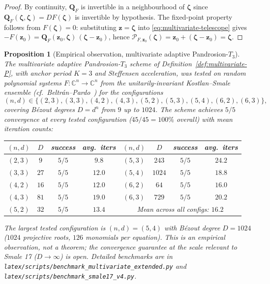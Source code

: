 \documentclass[11pt,a4paper]{article}
\newtheorem{proposition}[theorem]{Proposition}
\begin{document}
\begin{proof}
By continuity, $\mathbf{Q}_F$ is invertible in a neighbourhood of $\boldsymbol\zeta$ since $\mathbf{Q}_F(\boldsymbol\zeta, \boldsymbol\zeta) = DF(\boldsymbol\zeta)$ is invertible by hypothesis. The fixed-point property follows from $F(\boldsymbol\zeta) = 0$: substituting $\mathbf{z} = \boldsymbol\zeta$ into \eqref{eq:multivariate-telescope} gives $-F(\mathbf{z}_0) = \mathbf{Q}_F(\mathbf{z}_0, \boldsymbol\zeta)\,(\boldsymbol\zeta - \mathbf{z}_0)$, hence $\mathcal{P}_{F, \mathbf{z}_0}(\boldsymbol\zeta) = \mathbf{z}_0 + (\boldsymbol\zeta - \mathbf{z}_0) = \boldsymbol\zeta$.
\end{proof}

\begin{proposition}[Empirical observation, multivariate adaptive Pandrosion-$T_3$]\label{thm:multivariate-empirical}
The multivariate adaptive Pandrosion-$T_3$ scheme of Definition~\ref{def:multivariate-P}, with anchor period $K = 3$ and Steffensen acceleration, was tested on random polynomial systems $F: \mathbb{C}^n \to \mathbb{C}^n$ from the unitarily-invariant Kostlan--Smale ensemble (cf.\ Beltr\'an--Pardo~\cite{beltranpardo}) for the configurations
\begin{equation*}
(n, d) \in \{(2, 3), (3, 3), (4, 2), (4, 3), (5, 2), (5, 3), (5, 4), (6, 2), (6, 3)\},
\end{equation*}
covering B\'ezout degrees $D = d^n$ from $9$ up to $1024$. The scheme achieves $5/5$ convergence at \emph{every} tested configuration ($45/45 = 100\%$ overall) with mean iteration counts:
\begin{center}
\begin{tabular}{cccc|cccc}
\toprule
$(n, d)$ & $D$ & success & avg.\ iters & $(n, d)$ & $D$ & success & avg.\ iters \\
\midrule
$(2, 3)$ & $9$  & $5/5$ & $9.8$  & $(5, 3)$ & $243$  & $5/5$ & $24.2$ \\
$(3, 3)$ & $27$ & $5/5$ & $12.0$ & $(5, 4)$ & $1024$ & $5/5$ & $18.8$ \\
$(4, 2)$ & $16$ & $5/5$ & $12.0$ & $(6, 2)$ & $64$   & $5/5$ & $16.0$ \\
$(4, 3)$ & $81$ & $5/5$ & $19.0$ & $(6, 3)$ & $729$  & $5/5$ & $20.2$ \\
$(5, 2)$ & $32$ & $5/5$ & $13.4$ & \multicolumn{4}{c}{Mean across all configs: $16.2$} \\
\bottomrule
\end{tabular}
\end{center}
The largest tested configuration is $(n, d) = (5, 4)$ with B\'ezout degree $D = 1024$ ($1024$ projective roots, $126$ monomials per equation). \emph{This is an empirical observation, not a theorem; the convergence guarantee at the scale relevant to Smale 17 ($D \to \infty$) is open.} Detailed benchmarks are in \verb|latex/scripts/benchmark_multivariate_extended.py| and \verb|latex/scripts/benchmark_smale17_v4.py|.
\end{proposition}
\end{document}
